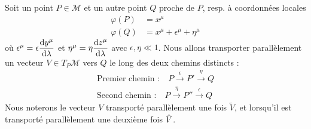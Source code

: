 Soit un point $P \in \mathcal{M}$ et un autre point $Q$ proche de $P$, resp. à coordonnées locales 
\begin{align}
    \varphi(P) &= x^\mu\\
    \varphi(Q) &= x^\mu + \epsilon^\mu + \eta^\mu
\end{align}
où $\epsilon^\mu = \epsilon \dfrac{\mathrm{d} y^\mu}{\mathrm{d} \lambda}$ et $\eta^\mu = \eta \dfrac{\mathrm{d} z^\mu}{\mathrm{d} \lambda}$ avec $\epsilon, \eta \ll 1$. Nous allons transporter parallèlement un vecteur $V \in T_P \mathcal{M}$ vers $Q$ le long des deux chemins distincts :
\begin{align*}
    \text{Premier chemin :} \quad P \overset{\epsilon}{\to} P' \overset{\eta}{\to} Q \\
    \text{Second chemin :} \quad P \overset{\eta}{\to} P'' \overset{\epsilon}{\to} Q 
\end{align*}
Nous noterons le vecteur $V$ transporté parallèlement une fois $\tilde{V}$, et lorsqu'il est transporté parallèlement une deuxième fois $\Hat{V}$.
